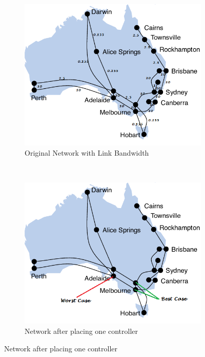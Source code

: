 \documentclass{article}
\begin{document}
 	\begin{figure}
 		\centering
 		\begin{subfigure}[b]{0.45\textwidth}
 			\includegraphics[width=\linewidth]{Images/aarnet2009.png}
 			\caption{Original Network with Link Bandwidth}
 			\label{fig:aarnet2009}
 		\end{subfigure}
 		~
 		\begin{subfigure}[b]{0.45\textwidth}
 			\includegraphics[width=\linewidth]{Images/aarnet2009mod.png}
 			\caption{Network after placing one controller}
 			\label{fig:aarnet2009mod}
 		\end{subfigure}

\end{figure}
\end{document}
